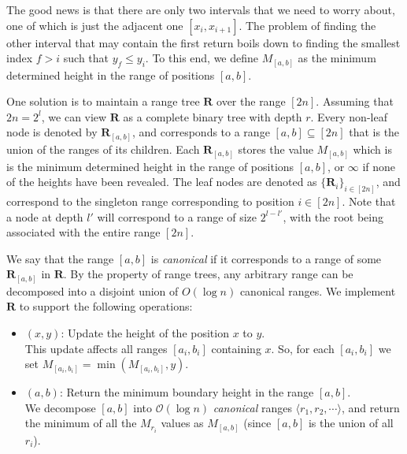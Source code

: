 The good news is that there are only two intervals that we need to worry about, one of which is just the adjacent one $[x_i, x_{i+1}]$.
The problem of finding the other interval that may contain the first return boils down to finding the smallest index $f>i$ such that $y_f\le y_i$.
To this end, we define $M_{[a,b]}$ as the minimum determined height in the range of positions $[a,b]$.

One solution is to maintain a range tree $\mathbf R$ \cite{comp_geo} over the range $[2n]$.
Assuming that $2n = 2^l$, we can view $\mathbf R$ as a complete binary tree with depth $r$.
Every non-leaf node is denoted by $\mathbf R_{[a,b]}$, and corresponds to a range $[a,b]\subseteq[2n]$ that is the union of the ranges of its children.
Each $\mathbf R_{[a,b]}$ stores the value $M_{[a,b]}$ which is is the minimum determined height
in the range of positions $[a,b]$, or $\infty$ if none of the heights have been revealed.
The leaf nodes are denoted as $\{\mathbf R_i\}_{i\in[2n]}$, and correspond to the singleton range corresponding to position $i\in [2n]$.
Note that a node at depth $l'$ will correspond to a range of size $2^{l-l'}$, with the root being associated with the entire range $[2n]$.

We say that the range $[a,b]$ is \emph{canonical} if it corresponds to a range of some $\mathbf{R}_{[a,b]}$ in $\mathbf R$.
By the property of range trees, any arbitrary range can be decomposed into a disjoint union of $O(\log n)$ canonical ranges.
We implement $\mathbf{R}$ to support the following operations:
\begin{itemize}
    \item {}$(x,y)$: Update the height of the position $x$ to $y$.\\
    This update affects all ranges $[a_i,b_i]$ containing $x$.
    So, for each $[a_i,b_i]$ we set $M_{[a_i,b_i]} = \min\left( M_{[a_i,b_i]}, y\right)$.
    \item {}$(a,b)$: Return the minimum boundary height in the range $[a,b]$.\\
    We decompose $[a,b]$ into $\mathcal O(\log n)$ \emph{canonical} ranges $ \langle r_1, r_2,\cdots\rangle$,
    and return the minimum of all the $M_{r_i}$ values as $M_{[a,b]}$ (since $[a,b]$ is the union of all $r_i$).
\end{itemize}

